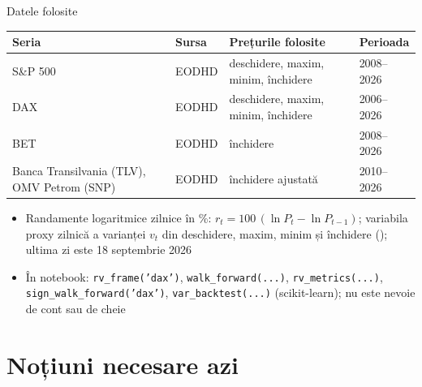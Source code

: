 \begin{frame}{Datele folosite}
\itemsize{\small}
\begin{center}
\footnotesize
\begin{tabular}{llll}
\toprule
\textbf{Seria} & \textbf{Sursa} & \textbf{Prețurile folosite} & \textbf{Perioada} \\
\midrule
S\&P 500 & EODHD & deschidere, maxim, minim, închidere & 2008--2026 \\
DAX & EODHD & deschidere, maxim, minim, închidere & 2006--2026 \\
BET & EODHD & închidere & 2008--2026 \\
Banca Transilvania (TLV), OMV Petrom (SNP) & EODHD & închidere ajustată & 2010--2026 \\
\bottomrule
\end{tabular}
\end{center}
\begin{itemize}
    \item Randamente logaritmice zilnice în \%: $r_t = 100\,(\ln P_t - \ln P_{t-1})$; variabila proxy zilnică a varianței $v_t$ din deschidere, maxim, minim și închidere (); ultima zi este 18 septembrie 2026
    \item În notebook: \texttt{rv\_frame('dax')}, \texttt{walk\_forward(...)}, \texttt{rv\_metrics(...)}, \texttt{sign\_walk\_forward('dax')}, \texttt{var\_backtest(...)} (scikit-learn); nu este nevoie de cont sau de cheie
\end{itemize}
\end{frame}


\section{Noțiuni necesare azi}

